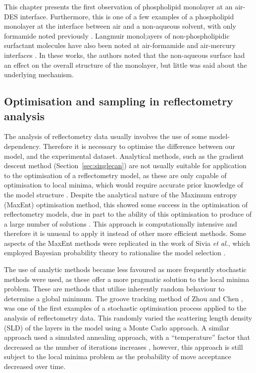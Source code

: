 This chapter presents the first observation of phospholipid monolayer at an air-DES interface.
Furthermore, this is one of a few examples of a phospholipid monolayer at the interface between air and a non-aqueous solvent, with only formamide noted previously \cite{graner_phospholipidic_1995}.
Langmuir monol;ayers of non-phospholipidic surfactant molecules have also been noted at air-formamide and air-mercury interfaces \cite{weinbach_self-assembled_1993,magnussen_self-assembly_1996,kraack_structure_2002}.
In these works, the authors noted that the non-aqueous surface had an effect on the overall structure of the monolayer, but little was said about the underlying mechanism.

\subsection{Optimisation and sampling in reflectometry analysis}
The analysis of reflectometry data usually involves the use of some model-dependency.
Therefore it is necessary to optimise the difference between our model, and the experimental dataset.
Analytical methods, such as the gradient descent method (Section~\ref{sec:singlecan}) are not usually suitable for application to the optimisation of a reflectometry model, as these are only capable of optimisation to local minima, which would require accurate prior knowledge of the model structure \cite{lovell_analysis_1999}.
Despite the analytical nature of the Maximum entropy (MaxEnt) optimisation method, this showed some success in the optimisation of reflectometry models, due in part to the ability of this optimisation to produce of a large number of solutions \cite{geoghegan_experimental_1996,bucknall_neutron_1997}.
This approach is computationally intensive and therefore it is unusual to apply it instead of other more efficient methods.
Some aspects of the MaxEnt methods were replicated in the work of Sivia \emph{et al.}, which employed Bayesian probability theory to rationalise the model selection \cite{geoghegan_experimental_1996,sivia_introduction_1993,sivia_bayesian_1998,sivia_analysis_1991}.

The use of analytic methods became less favoured as more frequently stochastic methods were used, as these offer a more pragmatic solution to the local minima problem.
These are methods that utilise inherently random behaviour to determine a global minimum.
The groove tracking method of Zhou and Chen \cite{zhou_model-independent_1993,zhou_theoretical_1995}, was one of the first examples of a stochastic optimisation process applied to the analysis of reflectometry data.
This randomly varied the scattering length density (SLD) of the layers in the model using a Monte Carlo approach.
A similar approach used a simulated annealing approach, with a ``temperature'' factor that decreased as the number of iterations increases \cite{kunz_model-free_1993}, however, this approach is still subject to the local minima problem as the probability of move acceptance decreased over time.

